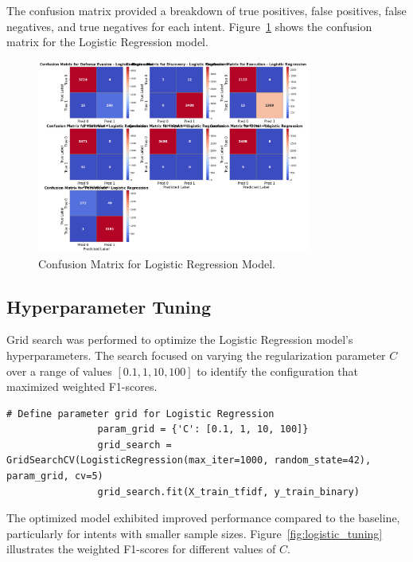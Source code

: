 The confusion matrix provided a breakdown of true positives, false positives, false negatives, and true negatives for each intent. Figure~\ref{fig:logistic_cm} shows the confusion matrix for the Logistic Regression model.

\begin{figure}[H]
    \centering
    \includegraphics[width=0.8\textwidth]{../figures/plots/section2/Logistic_Regression_base_evaluation.png}
    \caption{Confusion Matrix for Logistic Regression Model.}
    \label{fig:logistic_cm}
\end{figure}

\subsection{Hyperparameter Tuning}
Grid search was performed to optimize the Logistic Regression model's hyperparameters. The search focused on varying the regularization parameter \( C \) over a range of values \([0.1, 1, 10, 100]\) to identify the configuration that maximized weighted F1-scores.

            \begin{lstlisting}[caption={Parameter grid for Logistic Regression}, label={lst:logistic_param_grid}]
                # Define parameter grid for Logistic Regression
                param_grid = {'C': [0.1, 1, 10, 100]}
                grid_search = GridSearchCV(LogisticRegression(max_iter=1000, random_state=42), param_grid, cv=5)
                grid_search.fit(X_train_tfidf, y_train_binary)
            \end{lstlisting}

The optimized model exhibited improved performance compared to the baseline, particularly for intents with smaller sample sizes. Figure~\ref{fig:logistic_tuning} illustrates the weighted F1-scores for different values of \( C \).

